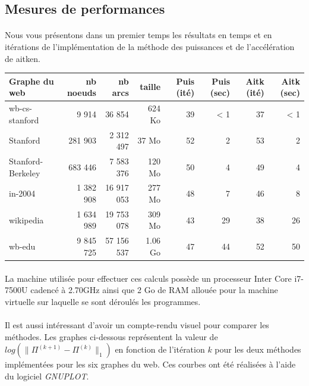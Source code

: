 	\subsection{Mesures de performances}
	
		\paragraph{}Nous vous présentons dans un premier temps les résultats en temps et en itérations de l'implémentation de la méthode des puissances et de l'accélération de aitken.
		
			\begin{center}\begin{tabular}{lrrrrrrr}
				\hline
				Graphe du web & nb noeuds & nb arcs & taille & Puis (ité) & Puis (sec) & Aitk (ité) & Aitk (sec) \\
				\hline
				wb-cs-stanford & 9 914 & 36 854 & 624 Ko & 39 & < 1 & 37 & < 1 \\
				Stanford & 281 903 & 2 312 497 & 37 Mo & 52 & 2 & 53 & 2 \\
				Stanford-Berkeley & 683 446 & 7 583 376 & 120 Mo & 50 & 4 & 49 & 4 \\
				in-2004 & 1 382 908 & 16 917 053 & 277 Mo & 48 & 7 & 46 & 8 \\
				wikipedia & 1 634 989 & 19 753 078 & 309 Mo & 43 & 29 & 38 & 26 \\
				wb-edu & 9 845 725 & 57 156 537 & 1.06 Go & 47 & 44 & 52 & 50 \\
				\hline
			\end{tabular}\end{center}
			
		\paragraph{}La machine utilisée pour effectuer ces calculs possède un processeur Inter Core i7-7500U cadencé à 2.70GHz ainsi que 2 Go de RAM allouée pour la machine virtuelle sur laquelle se sont déroulés les programmes.
		
		\paragraph{}Il est aussi intéressant d'avoir un compte-rendu visuel pour comparer les méthodes. Les graphes ci-dessous représentent la valeur de $log(\| \Pi^{(k + 1)} - \Pi^{(k)} \|_{1})$ en fonction de l'itération $k$ pour les deux méthodes implémentées pour les six graphes du web. Ces courbes ont été réalisées à l'aide du logiciel \textit{GNUPLOT}.

